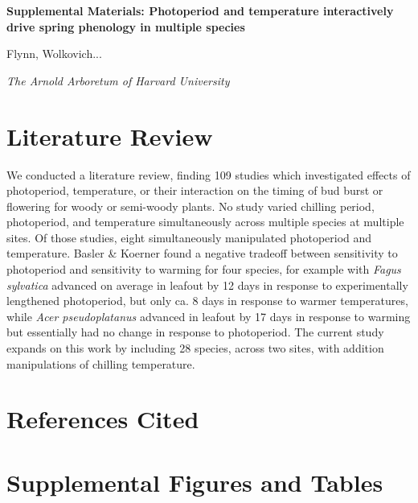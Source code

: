 \documentclass{article}
\begin{document}

\flushleft

\textbf{\large{Supplemental Materials: Photoperiod and temperature interactively drive spring phenology in multiple species}}

Flynn, Wolkovich...

\textit{The Arnold Arboretum of Harvard University}

\renewcommand{\thetable}{S\arabic{table}}
\renewcommand{\thefigure}{S\arabic{figure}}

\section*{Literature Review}

We conducted a literature review, finding 109 studies which investigated effects of photoperiod, temperature, or their interaction on the timing of bud burst or flowering for woody or semi-woody plants.  No study varied chilling period, photoperiod, and temperature simultaneously across multiple species at multiple sites. Of those studies, eight simultaneously manipulated photoperiod and temperature. Basler \& Koerner \cite{Basler:2014aa} found a negative tradeoff between sensitivity to photoperiod and sensitivity to warming for four species, for example with \emph{Fagus sylvatica} advanced on average in leafout by 12 days in response to experimentally lengthened photoperiod, but only ca. 8 days in response to warmer temperatures, while \emph{Acer pseudoplatanus} advanced in leafout by 17 days in response to warming but essentially had no change in response to photoperiod. The current study expands on this work by including 28 species, across two sites, with addition manipulations of chilling temperature.

\section*{References Cited}




\section*{Supplemental Figures and Tables}
\end{document}
